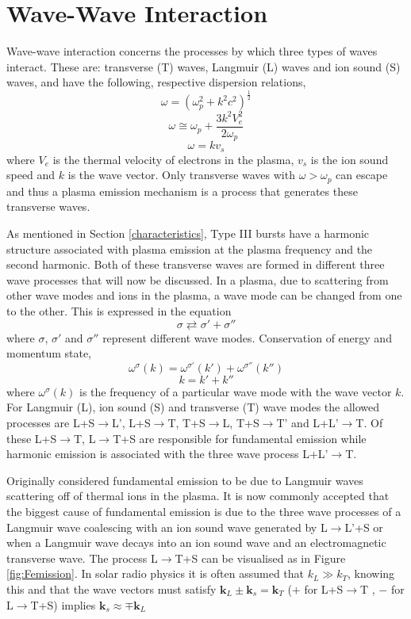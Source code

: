 \section{Wave-Wave Interaction}\label{Plasma Emission}
Wave-wave interaction concerns the processes by which three types of waves interact. These are: transverse (T) waves, Langmuir (L) waves and ion sound (S) waves, and have the following, respective dispersion relations,
$$ \omega=(\omega_p^2 +k^2c^2)^{\frac{1}{2}} $$
$$ \omega \cong \omega_p + \frac{3k^2V_e^2}{2 \omega_p}$$
$$ \omega = kv_s $$
where $V_e$ is the thermal velocity of electrons in the plasma, $v_s$ is the ion sound speed and $k$ is the wave vector. Only transverse waves with $\omega > \omega_p $ can escape and thus a plasma emission mechanism is a process that generates these transverse waves. 

As mentioned in Section \ref{characteristics}, Type III bursts have a harmonic structure associated with plasma emission at the plasma frequency and the second harmonic. Both of these transverse waves are formed in different three wave processes that will now be discussed.
In a plasma, due to scattering from other wave modes and ions in the plasma, a wave mode can be changed from one to the other. This is expressed in the equation 
$$ \sigma \rightleftarrows \sigma' + \sigma '' $$
where $\sigma$, $\sigma'$  and  $\sigma ''$ represent different wave modes. Conservation of energy and momentum state,
$$ \omega^{\sigma}(k)=\omega^{\sigma'}(k')+\omega^{\sigma''}(k'')$$
$$ k=k'+k''$$
where $ \omega^{\sigma}(k)$ is the frequency of a particular wave mode with the wave vector $k$. For Langmuir (L), ion sound (S) and transverse (T) wave modes the allowed processes are L+S$\rightarrow$L', L+S$\rightarrow$T,  T+S$\rightarrow$L,  T+S$\rightarrow$T' and  L+L'$\rightarrow$T. Of these L+S$\rightarrow$T,  L$\rightarrow$T+S are responsible for fundamental emission while harmonic emission is associated with the three wave process L+L'$\rightarrow$T.

Originally \cite{Ginzburg1958} considered fundamental emission to be due to Langmuir waves scattering off of thermal ions in the plasma. It is now commonly accepted that the biggest cause of fundamental emission is due to the three wave processes of a Langmuir wave coalescing with an ion sound wave generated by L$\rightarrow$L'+S or when a Langmuir wave decays into an ion sound wave and an electromagnetic transverse wave. The process L$\rightarrow$T+S can be visualised as in Figure \ref{fig:Femission}. In solar radio physics it is often assumed that $k_L \gg k_T$, knowing this and that the wave vectors must satisfy $\mathbf{k}_L \pm \mathbf{k}_s = \mathbf{k}_T$ ($+$ for L+S$\rightarrow$T , $-$ for L$\rightarrow$T+S) implies $\mathbf{k}_s \approx \mp \mathbf{k}_L$ 

